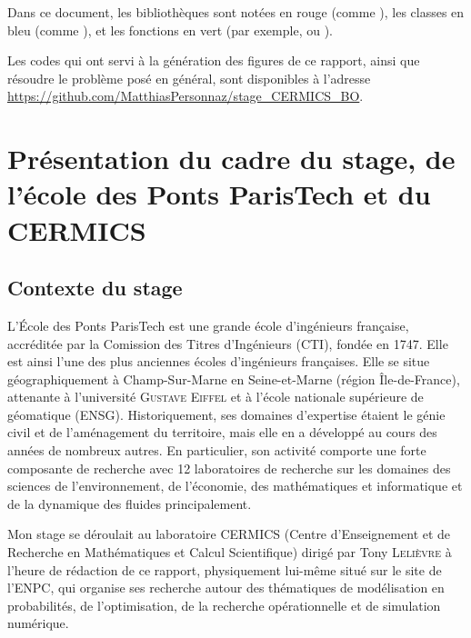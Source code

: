 \documentclass[svgnames,dvipsnames,a4paper,10pt,french]{report}
\begin{document}
\vspace{6cm}
Dans ce document, les bibliothèques sont notées en rouge (comme ), les classes en bleu (comme ), et les fonctions en vert (par exemple,  ou ).


Les codes qui ont servi à la génération des figures de ce rapport, ainsi que résoudre le problème posé en général, sont disponibles à l'adresse  \url{https://github.com/MatthiasPersonnaz/stage_CERMICS_BO}.



{
  \hypersetup{linkcolor=black}
  \tableofcontents
  \listoffigures
  \listoftables
  \listofalgorithms
}






\newpage


\chapter{Présentation du cadre du stage, de l'école des Ponts ParisTech et du CERMICS}

\section{Contexte du stage}
L'École des Ponts ParisTech est une grande école d'ingénieurs française, accréditée par la Comission des Titres d'Ingénieurs (CTI), fondée en 1747. Elle est ainsi l'une des plus anciennes écoles d'ingénieurs françaises. Elle se situe géographiquement à Champ-Sur-Marne en Seine-et-Marne (région Île-de-France), attenante à l'université \textsc{Gustave Eiffel} et à l'école nationale supérieure de géomatique (ENSG). Historiquement, ses domaines d'expertise étaient le génie civil et de l'aménagement du territoire, mais elle en a développé au cours des années de nombreux autres. En particulier, son activité comporte une forte composante de recherche avec 12 laboratoires de recherche sur les domaines des sciences de l'environnement, de l'économie, des mathématiques et informatique et de la dynamique des fluides principalement.

Mon stage se déroulait au laboratoire CERMICS (Centre d’Enseignement et de Recherche en Mathématiques et Calcul Scientifique) dirigé par Tony \textsc{Lelièvre} à l'heure de rédaction de ce rapport, physiquement lui-même situé sur le site de l'ENPC, qui organise ses recherche autour des thématiques  de modélisation en probabilités, de l'optimisation, de la recherche opérationnelle et de simulation numérique. 
\end{document}

